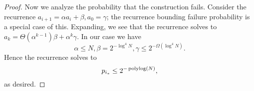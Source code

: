 \begin{proof}
  Now we analyze the probability that the construction fails. 
  Consider the recurrence $a_{i+1} = \alpha a_i + \beta, a_0 =
  \gamma$; the recurrence bounding failure probability is a
  special case of this. Expanding, we see that the recurrence
  solves to $a_k = \Theta(\alpha^{k-1})\beta + \alpha^k \gamma$.
  In our case we have 
  $$\alpha \le N, \beta = 2^{-\log^4 N}, \gamma \le 2^{-\Omega(\log^4 N)}.$$
  Hence the recurrence solves to 
  $$p_{i_*} \le 2^{-\operatorname{\textnormal{polylog}}(N)},$$
  as desired.

\end{proof}


